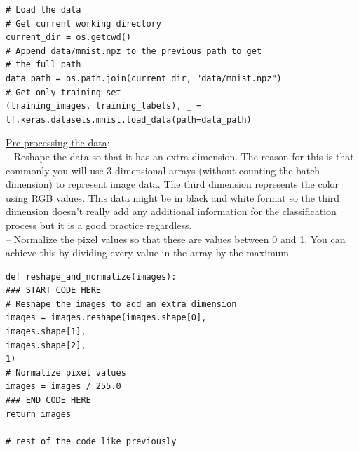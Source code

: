\documentclass[20pt]{article}
\begin{document}
\begin{itemize}
\begin{verbatim}
# Load the data
# Get current working directory
current_dir = os.getcwd()
# Append data/mnist.npz to the previous path to get
# the full path
data_path = os.path.join(current_dir, "data/mnist.npz")
# Get only training set
(training_images, training_labels), _ =
tf.keras.datasets.mnist.load_data(path=data_path)
		\end{verbatim}
		\underline{Pre-processing the data}:\\
		-- Reshape the data so that it has an extra dimension. The reason for this is that commonly you will use 3-dimensional arrays (without counting the batch dimension) to represent image data. The third dimension represents the color using RGB values. This data might be in black and white format so the third dimension doesn't really add any additional information for the classification process but it is a good practice regardless.\\
		-- Normalize the pixel values so that these are values between 0 and 1. You can achieve this by dividing every value in the array by the maximum.
		\begin{verbatim}
def reshape_and_normalize(images):
### START CODE HERE
# Reshape the images to add an extra dimension
images = images.reshape(images.shape[0],
images.shape[1],
images.shape[2],
1)
# Normalize pixel values
images = images / 255.0
### END CODE HERE
return images

# rest of the code like previously
		\end{verbatim}
	\end{itemize}
\end{document}

